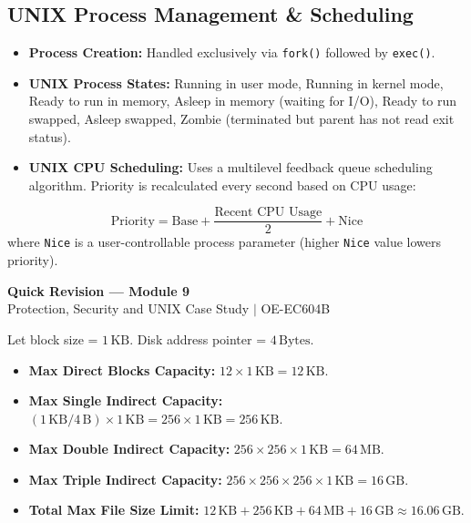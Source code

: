 \documentclass[12pt,a4paper]{article}
\begin{document}
\subsection{UNIX Process Management \& Scheduling}
\begin{itemize}[leftmargin=*, itemsep=3pt]
  \item \textbf{Process Creation:} Handled exclusively via \texttt{fork()} followed by \texttt{exec()}.
  \item \textbf{UNIX Process States:} Running in user mode, Running in kernel mode, Ready to run in memory, Asleep in memory (waiting for I/O), Ready to run swapped, Asleep swapped, Zombie (terminated but parent has not read exit status).
  \item \textbf{UNIX CPU Scheduling:} Uses a multilevel feedback queue scheduling algorithm. Priority is recalculated every second based on CPU usage:
\end{itemize}
$$\text{Priority} = \text{Base} + \frac{\text{Recent CPU Usage}}{2} + \text{Nice}$$
where \texttt{Nice} is a user-controllable process parameter (higher \texttt{Nice} value lowers priority).

\newpage
\begin{center}
  {\large\bfseries\color{myred} Quick Revision --- Module 9}\\[3pt]
  {\small\color{mydark} Protection, Security and UNIX Case Study $|$ OE-EC604B}
\end{center}
\noindent{\color{myred}\rule{\linewidth}{1.2pt}}
\vspace{4pt}

\begin{tcolorbox}[formulabox, title={\textbf{UNIX Inode Max File Size Calculations}}]
Let block size = $1\,\text{KB}$. Disk address pointer = $4\,\text{Bytes}$.
\begin{itemize}[leftmargin=*, itemsep=3pt]
  \item \textbf{Max Direct Blocks Capacity:} $12 \times 1\,\text{KB} = 12\,\text{KB}$.
  \item \textbf{Max Single Indirect Capacity:} $(1\,\text{KB} / 4\,\text{B}) \times 1\,\text{KB} = 256 \times 1\,\text{KB} = 256\,\text{KB}$.
  \item \textbf{Max Double Indirect Capacity:} $256 \times 256 \times 1\,\text{KB} = 64\,\text{MB}$.
  \item \textbf{Max Triple Indirect Capacity:} $256 \times 256 \times 256 \times 1\,\text{KB} = 16\,\text{GB}$.
  \item \textbf{Total Max File Size Limit:} $12\,\text{KB} + 256\,\text{KB} + 64\,\text{MB} + 16\,\text{GB} \approx 16.06\,\text{GB}$.
\end{itemize}
\end{tcolorbox}
\end{document}
